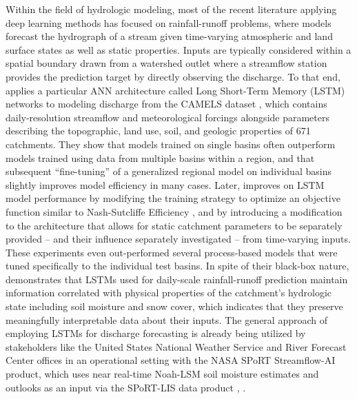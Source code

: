 Within the field of hydrologic modeling, most of the recent literature applying deep learning methods has focused on rainfall-runoff problems, where models forecast the hydrograph of a stream given time-varying atmospheric and land surface states as well as static properties. Inputs are typically considered within a spatial boundary drawn from a watershed outlet where a streamflow station provides the prediction target by directly observing the discharge. To that end, \citep{kratzert_rainfallrunoff_2018} applies a particular ANN architecture called Long Short-Term Memory (LSTM) networks to modeling discharge from the CAMELS dataset \citep{addor_camels_2017}, which contains daily-resolution streamflow and meteorological forcings alongside parameters describing the topographic, land use, soil, and geologic properties of 671 catchments. They show that models trained on single basins often outperform models trained using data from multiple basins within a region, and that subsequent ``fine-tuning'' of a generalized regional model on individual basins slightly improves model efficiency in many cases. Later, \citep{kratzert_towards_2019} improves on LSTM model performance by modifying the training strategy to optimize an objective function similar to Nash-Sutcliffe Efficiency \citep{nash_river_1970}, and by introducing a modification to the architecture that allows for static catchment parameters to be separately provided -- and their influence separately investigated -- from time-varying inputs. These experiments even out-performed several process-based models that were tuned specifically to the individual test basins. In spite of their black-box nature, \citep{lees_hydrological_2022} demonstrates that LSTMs used for daily-scale rainfall-runoff prediction maintain information correlated with physical properties of the catchment's hydrologic state including soil moisture and snow cover, which indicates that they preserve meaningfully interpretable data about their inputs. The general approach of employing LSTMs for discharge forecasting is already being utilized by stakeholders like the United States National Weather Service and River Forecast Center offices in an operational setting with the NASA SPoRT Streamflow-AI product, which uses near real-time Noah-LSM soil moisture estimates and outlooks as an input via the SPoRT-LIS data product \citep{white_nasa_2025}, \citep{case_nasa_2022}.

